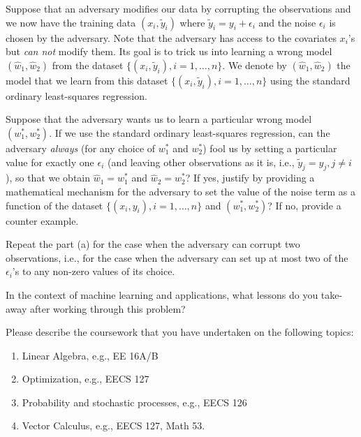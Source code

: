 \documentclass[preview]{standalone}
\begin{document}
Suppose that an adversary modifies our data by corrupting the observations and we now have the training data $(x_i, \tilde y_i)$
where $\tilde y_i = y_i +\epsilon_i$ and the noise $\epsilon_i$ is chosen by the adversary.
Note that the adversary has access to the covariates $x_i$'s but \emph{can not} modify them.
Its goal is to trick us into learning a wrong model $(\hat w_1, \hat w_2)$ from the dataset $\{(x_i, \tilde y_i), i=1, \ldots, n\}$.
We denote by $(\hat w_1, \hat w_2)$ the model that we learn from this dataset $\{(x_i, \tilde y_i), i=1, \ldots, n\}$ using the standard ordinary least-squares regression.
\begin{Parts}

\Part Suppose that the adversary wants us to learn a particular wrong model $(w_1^*, w_2^*)$. 
If we use the standard ordinary least-squares regression, can the adversary \emph{always} (for any choice of $w_1^*$ and $w_2^*$) fool us
by setting a particular value for exactly one $\epsilon_i$ (and leaving other observations as it is, i.e., $\tilde y_j = y_j, j \neq i$), so that we obtain
$\hat w_1 = w_1^*$ and $\hat w_2 = w_2^*$?
If yes, justify by providing a mathematical mechanism for the adversary to set the value of the noise term as a function of the dataset $\{(x_i, y_i), i=1, \ldots, n\}$ and $(w_1^*, w_2^*)$?
If no, provide a counter example.



\Part Repeat the part (a) for the case when the adversary can corrupt two observations, i.e., for the case when the adversary can set up at most two of the $\epsilon_i$'s to any non-zero values of its choice.




\Part 
In the context of machine learning and applications, what lessons do you take-away after working through this problem?



\end{Parts}


Please describe the coursework that you have undertaken on the
following topics:

\begin{enumerate}[label=(\alph*)]
	\item Linear Algebra, e.g., EE 16A/B
	\item Optimization, e.g., EECS 127
	\item Probability and stochastic processes, e.g., EECS 126
	\item Vector Calculus, e.g., EECS 127, Math 53.
\end{enumerate}
\end{document}
